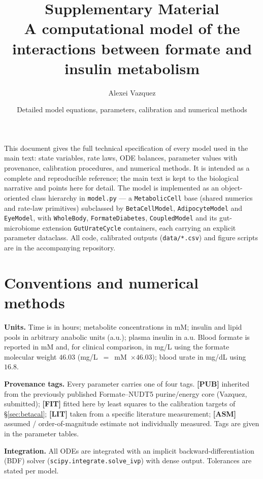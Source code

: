 \documentclass[11pt]{article}
\title{\bfseries Supplementary Material\\[2pt]
\large A computational model of the interactions between formate and insulin
metabolism}
\author{Alexei Vazquez}
\date{Detailed model equations, parameters, calibration and numerical methods}
\begin{document}
\maketitle

\noindent This document gives the full technical specification of every model used
in the main text: state variables, rate laws, ODE balances, parameter values with
provenance, calibration procedures, and numerical methods. It is intended as a
complete and reproducible reference; the main text is kept to the biological
narrative and points here for detail. The model is implemented as an
object-oriented class hierarchy in \texttt{model.py} --- a \texttt{MetabolicCell}
base (shared numerics and rate-law primitives) subclassed by
\texttt{BetaCellModel}, \texttt{AdipocyteModel} and \texttt{EyeModel}, with
\texttt{WholeBody}, \texttt{FormateDiabetes}, \texttt{CoupledModel} and its
gut-microbiome extension \texttt{GutUrateCycle} containers,
each carrying an explicit parameter dataclass. All code, calibrated outputs
(\texttt{data/*.csv}) and figure scripts are in the accompanying repository.

\tableofcontents

\section{Conventions and numerical methods}\label{sec:conv}

\textbf{Units.} Time is in hours; metabolite concentrations in mM; insulin and
lipid pools in arbitrary anabolic units (a.u.); plasma insulin in a.u. Blood
formate is reported in mM and, for clinical comparison, in mg/L using the formate
molecular weight $46.03$ (\mbox{mg/L $=$ mM $\times 46.03$}); blood urate in mg/dL
using $16.8$.

\textbf{Provenance tags.} Every parameter carries one of four tags.
\textbf{[PUB]} inherited from the previously published Formate--NUDT5 purine/energy
core (Vazquez, submitted); \textbf{[FIT]} fitted here by least squares to the
calibration targets of \S\ref{sec:betacal}; \textbf{[LIT]} taken from a specific
literature measurement; \textbf{[ASM]} assumed / order-of-magnitude estimate not
individually measured. Tags are given in the parameter tables.

\textbf{Integration.} All ODEs are integrated with an implicit
backward-differentiation (BDF) solver
(\texttt{scipy.integrate.\allowbreak solve\_ivp}) with dense output. Tolerances
are stated per model.
\end{document}
